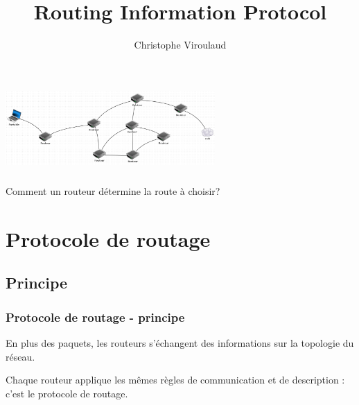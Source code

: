 \documentclass[svgnames,11pt]{beamer}
\author[]{Christophe Viroulaud}
\title{Routing Information Protocol}
\date{\framebox{\textbf{Archi 11}}}
\institute{Terminale - NSI}
\begin{document}
\begin{frame}
\titlepage
\end{frame}
\begin{frame}
    \frametitle{}

    \begin{center}
    \centering
    \includegraphics[width=8cm]{ressources/reseau-intro.png}
    \label{IMG}
    \end{center}

\end{frame}
\begin{frame}
    \frametitle{}

\begin{framed}
    \centering Comment un routeur détermine la route à choisir?
\end{framed}
\end{frame}
\section{Protocole de routage}
\subsection{Principe}
\begin{frame}
    \frametitle{Protocole de routage - principe}
    En plus des paquets, les routeurs s’échangent des informations sur la topologie du réseau.
    \begin{aretenir}[]
        Chaque routeur applique les mêmes règles de communication et de description : c’est le protocole de routage.
    \end{aretenir}

\end{frame}
\end{document}
